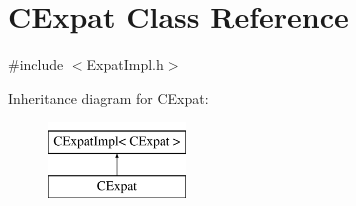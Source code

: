 \hypertarget{class_c_expat}{\section{\-C\-Expat \-Class \-Reference}
\label{class_c_expat}
}


{\ttfamily \#include $<$\-Expat\-Impl.\-h$>$}

\-Inheritance diagram for \-C\-Expat\-:\begin{figure}[H]
\begin{center}
\leavevmode
\includegraphics[height=2.000000cm]{class_c_expat}
\end{center}
\end{figure}
